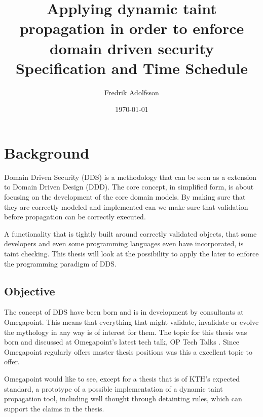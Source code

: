 \documentclass{../kththesis}
\title{Applying dynamic taint propagation in order to enforce domain driven security \\
        \large Specification and Time Schedule}
\author{Fredrik Adolfsson}
\date{\today}
\begin{document}
\frontmatter


\titlepage


\tableofcontents


\mainmatter



\chapter{Background}
Domain Driven Security (DDS) is a methodology that can be seen as a extension to Domain Driven Design (DDD). The core concept, in simplified form, is about focusing on the development of the core domain models. By making sure that they are correctly modeled and implemented can we make sure that validation before propagation can be correctly executed. \parencite{evans_2015, EvansEric2004Dd:t, Wilander2009, Johnsson2009}

A functionality that is tightly built around correctly validated objects, that some developers and even some programming languages even have incorporated, is taint checking. \parencite{perl, ruby, Clause2007} This thesis will look at the possibility to apply the later to enforce the programming paradigm of DDS.


\section{Objective}
The concept of DDS have been born and is in development by consultants at Omegapoint. This means that everything that might validate, invalidate or evolve the mythology in any way is of interest for them. The topic for this thesis was born and discussed at Omegapoint's latest tech talk, OP Tech Talks \parencite{Tardell}. Since Omegapoint regularly offers master thesis positions was this a excellent topic to offer.

Omegapoint would like to see, except for a thesis that is of KTH's expected standard, a prototype of a possible implementation of a dynamic taint propagation tool, including well thought through detainting rules, which can support the claims in the thesis.
\end{document}
